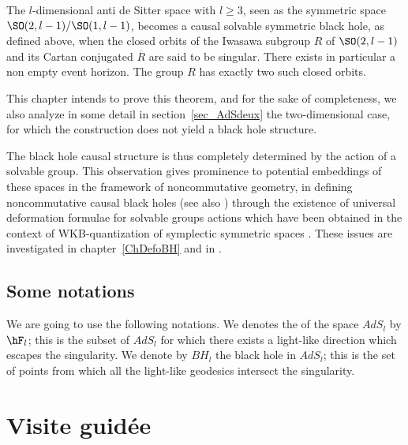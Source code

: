 \begin{theorem}
The $l$-dimensional anti de Sitter space with $l\geq 3$, seen as the symmetric space $\SO(2,l-1)/\SO(1,l-1)$, becomes a causal solvable symmetric black hole, as defined above, when the closed orbits of the Iwasawa subgroup $R$ of $\SO(2,l-1)$ and its Cartan conjugated $\overline{ R }$ are said to be singular. There exists in particular a non empty event horizon. The group $R$ has exactly two such closed orbits.
\label{ThoLeBut}
 \end{theorem}

This chapter intends to prove this theorem, and for the sake of completeness, we also analyze in some detail in section~\ref{sec_AdSdeux} the two-dimensional case, for which the construction does not yield a black hole structure.

The black hole causal structure is thus completely determined by the action of a solvable group.  This observation gives prominence to potential embeddings of these spaces in the framework of noncommutative geometry, in defining noncommutative causal black holes (see also \cite{BDRS}) through the existence of universal deformation formulae for solvable groups actions which have been obtained in the context of WKB-quantization of symplectic symmetric spaces \cite{StrictSolvableSym,Biel-Massar-2}. These issues are investigated in chapter~\ref{ChDefoBH} and in \cite{articleBVCS}.


					\subsection{Some notations}

We are going to use the following notations. We denotes the  of the space $AdS_l$ by $\hF_l$; this is the subset of $AdS_l$ for which there exists a light-like direction which escapes the singularity. We denote by $BH_l$ the black hole in $AdS_l$; this is the set of points from which all the light-like geodesics intersect the singularity.



\section{Visite guidée}

